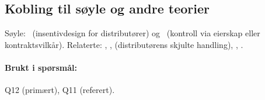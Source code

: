 \subsection*{Kobling til søyle og andre teorier}
Søyle: \SThree\ (insentivdesign for distributører) og \SOne\ (kontroll via eierskap eller kontraktsvilkår). Relaterte: , ,  (distributørens skjulte handling), , .

\paragraph{Brukt i spørsmål:} Q12 (primært), Q11 (referert).
